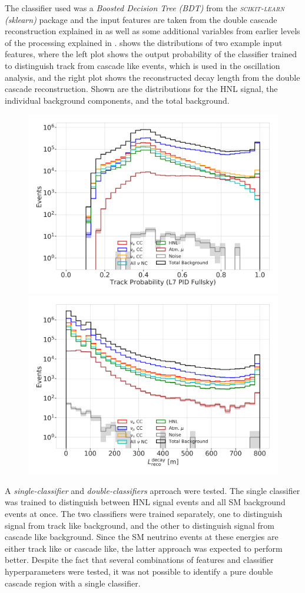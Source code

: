 The classifier used was a \textit{Boosted Decision Tree (BDT)} from the \textit{\textsc{scikit-learn} (sklearn)} package  and the input features are taken from the double cascade reconstruction explained in  as well as some additional variables from earlier levels of the processing explained in .  shows the distributions of two example input features, where the left plot shows the output probability of the classifier trained to distinguish track from cascade like events, which is used in the oscillation analysis, and the right plot shows the reconstructed decay length from the double cascade reconstruction. Shown are the distributions for the HNL signal, the individual background components, and the total background. 

\begin{figure}[h]
	\centering
    \includegraphics[width=0.49\linewidth]{figures/results/190607/classification/1_d_distr_L7_PIDClassifier_FullSky_ProbTrack_with_ratio_unweighted.png}
    \includegraphics[width=0.49\linewidth]{figures/results/190607/classification/1_d_distr_reco_decayL_with_ratio_unweighted.png}
    \caption[]{}
\end{figure}

A \textit{single-classifier} and \textit{double-classifiers} aprroach were tested. The single classifier was trained to distinguish between HNL signal events and all SM background events at once. The two classifiers were trained separately, one to distinguish signal from track like background, and the other to distinguish signal from cascade like background. Since the SM neutrino events at these energies are either track like or cascade like, the latter approach was expected to perform better. Despite the fact that several combinations of features and classifier hyperparameters were tested, it was not possible to identify a pure double cascade region with a single classifier.

